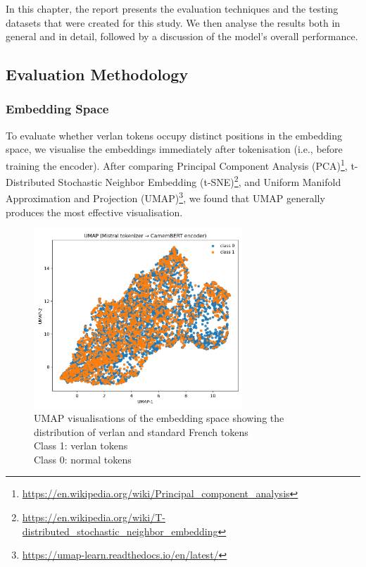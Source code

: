 \documentclass[12pt]{article}
\begin{document}
In this chapter, the report presents the evaluation techniques and the testing datasets that were created for this study. 
We then analyse the results both in general and in detail, followed by a discussion of the model's overall performance.

\subsection{Evaluation Methodology}

\subsubsection{Embedding Space}
To evaluate whether verlan tokens occupy distinct positions in the embedding space, 
we visualise the embeddings immediately after tokenisation (i.e., before training the encoder). 
After comparing Principal Component Analysis (PCA)\footnote{\url{https://en.wikipedia.org/wiki/Principal_component_analysis}}, 
t-Distributed Stochastic Neighbor Embedding (t-SNE)\footnote{\url{https://en.wikipedia.org/wiki/T-distributed_stochastic_neighbor_embedding}}, 
and Uniform Manifold Approximation and Projection (UMAP)\footnote{\url{https://umap-learn.readthedocs.io/en/latest/}}, 
we found that UMAP generally produces the most effective visualisation\cite{pearson1901pca,maaten2008tsne,mcinnes2018umap}.

\begin{figure}[H]
    \centering
    \includegraphics[width=0.7\textwidth]{figures/mistral_bert_umap.png}
    \caption{UMAP visualisations of the embedding space showing the distribution of verlan and standard French tokens\\Class 1: verlan tokens\\Class 0: normal tokens}
    \label{fig:umap_comparison}
\end{figure}
\end{document}

